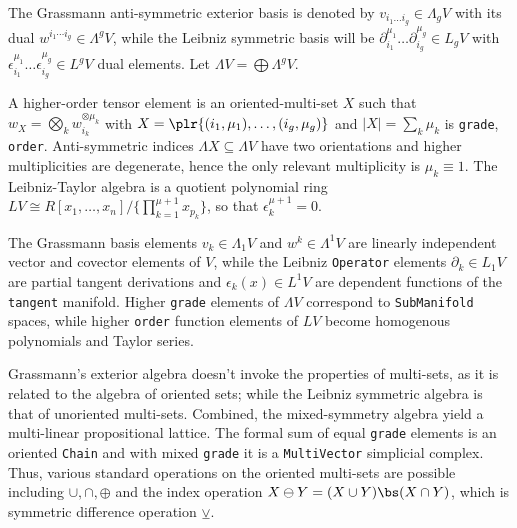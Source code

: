 \documentclass{juliacon}
\begin{document}
\begin{definition}
	The Grassmann anti-symmetric exterior basis is denoted by $v_{i_1\dots i_g}\in\Lambda_gV$ with its dual $w^{i_1\cdots i_g}\in\Lambda^gV$, while the Leibniz symmetric basis will be $\partial_{i_1}^{\mu_1}\dots\partial_{i_g}^{\mu_g}\in L_gV$ with $\epsilon_{i_1}^{\mu_1}\dots\epsilon_{i_g}^{\mu_g}\in L^gV$ dual elements. Let $\Lambda V = \bigoplus \Lambda^g V$.
\end{definition}
A higher-order tensor element is an oriented-multi-set $X$ %
such that $w_X = \bigotimes_k w_{i_k}^{\otimes\mu_k}$ with $X = \plr{(i_1,\mu_1),\dots,(i_g,\mu_g)}$ and $|X|=\sum_k\mu_k$ is \verb`grade`,$\,$ \verb`order`.
Anti-symmetric indices $\Lambda X\subseteq\Lambda V$ have two orientations and higher multiplicities are degenerate, hence the only relevant multiplicity is $\mu_k\equiv 1$.
The Leibniz-Taylor algebra \cite{taylor-algebra} is a quotient polynomial ring $LV\cong R[x_1,\dots,x_n]/\{\prod_{k=1}^{\mu+1} x_{p_k}\}$, so that $\epsilon_k^{\mu+1}=0$. %

The Grassmann basis elements $v_k\in\Lambda_1V$ and $w^k\in\Lambda^1V$ are linearly independent vector and covector elements of $V$, while the Leibniz \verb`Operator` elements $\partial_k\in L_1V$ are partial tangent derivations and $\epsilon_k(x)\in L^1V$ are dependent functions of the \verb`tangent` manifold.
Higher \verb`grade` elements of $\Lambda V$ correspond to \verb`SubManifold` spaces, while higher \verb`order` function elements of $LV$ become homogenous polynomials and Taylor series.

Grassmann's exterior algebra doesn't invoke the properties of multi-sets, as it is related to the algebra of oriented sets; while the Leibniz symmetric algebra is that of unoriented multi-sets.
Combined, the mixed-symmetry algebra yield a multi-linear propositional lattice.
The formal sum of equal \verb`grade` elements is an oriented \verb`Chain` and with mixed \verb`grade` it is a \verb`MultiVector` simplicial complex.
Thus, various standard operations on the oriented multi-sets are possible including $\cup,\cap,\oplus$ and the index operation $X\ominus Y=(X\cup Y)\bs(X\cap Y)$, which is symmetric difference operation $\veebar$.
\end{document}

